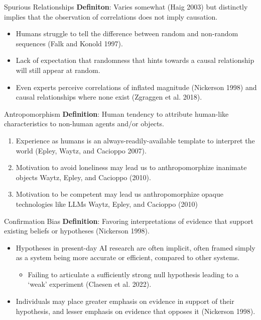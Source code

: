 \documentclass[
  10pt,
  ignorenonframetext,
  aspectratio=169,
  notheorems]{beamer}
\providecommand{\tightlist}{%
  \setlength{\itemsep}{0pt}\setlength{\parskip}{0pt}}\usepackage{longtable,booktabs,array}
\begin{document}
\begin{frame}{Spurious Relationships}
\label{spurious-relationships}
\textbf{Definiton}: Varies somewhat (Haig 2003) but distinctly implies
that the observation of correlations does not imply causation.

\begin{itemize}
\tightlist
\item
  Humans struggle to tell the difference between random and non-random
  sequences (Falk and Konold 1997).
\item
  Lack of expectation that randomness that hints towards a causal
  relationship will still appear at random.
\item
  Even experts perceive correlations of inflated magnitude (Nickerson
  1998) and causal relationships where none exist (Zgraggen et al.
  2018).
\end{itemize}
\end{frame}

\begin{frame}{Antropomorphism}
\label{antropomorphism}
\textbf{Definition}: Human tendency to attribute human-like
characteristics to non-human agents and/or objects.

\begin{enumerate}
\tightlist
\item
  Experience as humans is an always-readily-available template to
  interpret the world (Epley, Waytz, and Cacioppo 2007).
\item
  Motivation to avoid loneliness may lead us to anthropomorphize
  inanimate objects Waytz, Epley, and Cacioppo (2010).
\item
  Motivation to be competent may lead us anthropomorphize opaque
  technologies like LLMs Waytz, Epley, and Cacioppo (2010)
\end{enumerate}
\end{frame}

\begin{frame}{Confirmation Bias}
\label{confirmation-bias}
\textbf{Definition}: Favoring interpretations of evidence that support
existing beliefs or hypotheses (Nickerson 1998).

\begin{itemize}
\tightlist
\item
  Hypotheses in present-day AI research are often implicit, often framed
  simply as a system being more accurate or efficient, compared to other
  systems.

  \begin{itemize}
  \tightlist
  \item
    Failing to articulate a sufficiently strong null hypothesis leading
    to a `weak' experiment (Claesen et al. 2022).
  \end{itemize}
\item
  Individuals may place greater emphasis on evidence in support of their
  hypothesis, and lesser emphasis on evidence that opposes it (Nickerson
  1998).
\end{itemize}
\end{frame}
\end{document}
